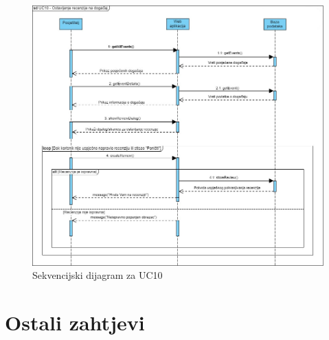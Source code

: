				\begin{figure}[htbp]
					\centering
					\includegraphics[width=1\textwidth]{dijagrami/seq_diagram_review.jpg}
					\caption{Sekvencijski dijagram za UC10}
				\label{fig:my_image}
				\end{figure}
				\eject
	
		\section{Ostali zahtjevi}
			 
